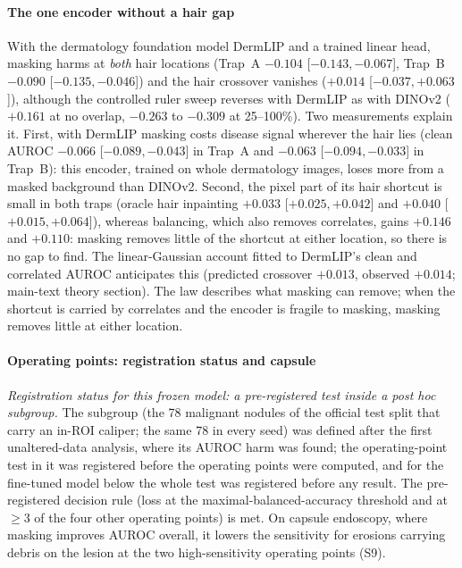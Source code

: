 \paragraph{The one encoder without a hair gap} With the dermatology foundation model DermLIP and a trained linear
head, masking harms at \emph{both} hair locations (Trap~A $-0.104$ [$-0.143, -0.067$], Trap~B $-0.090$
[$-0.135, -0.046$]) and the hair crossover vanishes ($+0.014$ [$-0.037, +0.063$]), although the controlled ruler sweep
reverses with DermLIP as with DINOv2 ($+0.161$ at no overlap, $-0.263$ to $-0.309$ at 25--100\%). Two measurements
explain it. First, with DermLIP masking costs disease signal wherever the hair lies (clean AUROC $-0.066$
[$-0.089, -0.043$] in Trap~A and $-0.063$ [$-0.094, -0.033$] in Trap~B): this encoder, trained on whole dermatology
images, loses more from a masked background than DINOv2. Second, the pixel part of its hair shortcut is small in both
traps (oracle hair inpainting $+0.033$ [$+0.025, +0.042$] and $+0.040$ [$+0.015, +0.064$]), whereas balancing, which
also removes correlates, gains $+0.146$ and $+0.110$: masking removes little of the shortcut at either location, so
there is no gap to find. The linear-Gaussian account fitted to DermLIP's clean and correlated AUROC anticipates this
(predicted crossover $+0.013$, observed $+0.014$; main-text theory section). The law describes what masking can remove; when the shortcut is carried by
correlates and the encoder is fragile to masking, masking removes little at either location.

\paragraph{Operating points: registration status and capsule} \emph{Registration status for this frozen model: a pre-registered test inside a
post hoc subgroup.} The subgroup (the 78 malignant nodules of the official test split that carry an in-ROI caliper; the
same 78 in every seed) was defined after the first unaltered-data analysis, where its AUROC harm was found; the
operating-point test in it was registered before the operating points were computed, and for the fine-tuned model below
the whole test was registered before any result. The pre-registered decision rule
(loss at the maximal-balanced-accuracy threshold and at $\ge3$ of the four other operating points) is met. On capsule
endoscopy, where masking improves AUROC overall, it lowers the sensitivity for erosions carrying debris on the lesion
at the two high-sensitivity operating points (S9).

